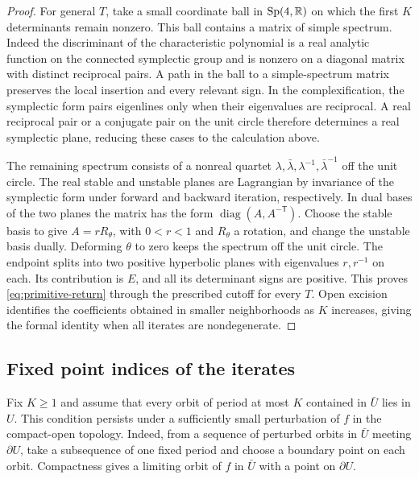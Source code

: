 \begin{proof}
For general $T$, take a small coordinate ball in
$\operatorname{Sp}(4,\mathbb R)$ on which the first $K$ determinants
remain nonzero. This ball contains a matrix of simple spectrum.
Indeed the discriminant of the characteristic polynomial is a real
analytic function on the connected symplectic group and is nonzero
on a diagonal matrix with distinct reciprocal pairs. A path in the
ball to a simple-spectrum matrix preserves the local insertion and
every relevant sign. In the complexification, the symplectic form
pairs eigenlines only when their eigenvalues are reciprocal. A real
reciprocal pair or a conjugate pair on the unit circle therefore
determines a real symplectic plane, reducing these cases to the
calculation above.

The remaining spectrum consists of a nonreal quartet
$\lambda,\bar\lambda,\lambda^{-1},\bar\lambda^{-1}$ off the unit
circle. The real stable and unstable planes are Lagrangian by
invariance of the symplectic form under forward and backward
iteration, respectively. In dual bases of the two planes the
matrix has the form $\operatorname{diag}(A,A^{-\mathsf T})$.
Choose the stable basis to give $A=rR_\theta$, with $0<r<1$
and $R_\theta$ a rotation, and change the unstable basis dually.
Deforming $\theta$ to zero keeps the spectrum off the unit circle.
The endpoint splits into two positive hyperbolic planes with
eigenvalues $r,r^{-1}$ on each. Its contribution is $E$, and all
its determinant signs are positive. This proves
\eqref{eq:primitive-return} through the prescribed cutoff for
every $T$. Open excision identifies the coefficients obtained in
smaller neighborhoods as $K$ increases, giving the formal identity
when all iterates are nondegenerate.
\end{proof}

\subsection{Fixed point indices of the iterates}\label{sec:indices}

Fix $K\ge1$ and assume that every orbit of period at most $K$
contained in $\bar U$ lies in $U$. This condition persists under a
sufficiently small perturbation of $f$ in the compact-open topology.
Indeed, from a sequence of perturbed orbits in $\bar U$ meeting
$\partial U$, take a subsequence of one fixed period and choose a
boundary point on each orbit. Compactness gives a limiting orbit of
$f$ in $\bar U$ with a point on $\partial U$.

